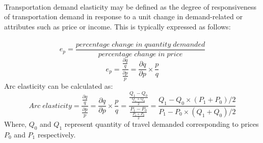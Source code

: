 \paragraph{}
Transportation demand elasticity may be defined as the degree of responsiveness of transportation demand in response to a unit change in demand-related or attributes such as price or income. This is typically expressed as follows:\\\\
$$ e_p =  \frac{percentage\; change\; in\; quantity\; demanded}{percentage\; change\; in\; price}$$
\begin{equation}
	e_p = \frac{\frac{\partial q}{q}}{\frac{\partial p}{p}} = \frac{\partial q}{\partial p} \times \frac{p}{q}
	\label{elasticity}
\end{equation}
Arc elasticity can be calculated as:
\begin{equation}
	Arc\; elasticity = \frac{\frac{\partial q}{q}}{\frac{\partial p}{p}} = \frac{\partial q}{\partial p} \times \frac{p}{q} = \frac{\frac{Q_1 - Q_0}{\frac{Q_1 + Q_0}{2}}}{\frac{P_1 - P_0}{\frac{P_1 + P_0}{2}}} = \frac{Q_1 - Q_0 \times (P_1 + P_0)/2}{P_1 - P_0 \times (Q_1 + Q_0)/2}
\end{equation}
Where, $Q_0$ and $Q_1$ represent quantity of travel demanded corresponding to prices $P_0$ and $P_1$ respectively.
